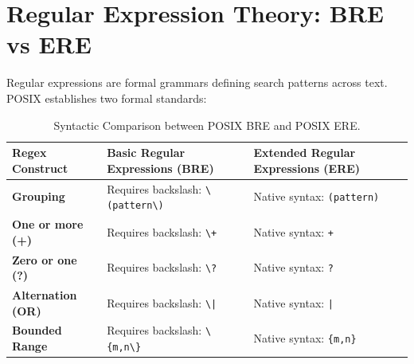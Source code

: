 \section{Regular Expression Theory: BRE vs ERE}
Regular expressions are formal grammars defining search patterns across text. POSIX establishes two formal standards:

\begin{table}[htbp]
\centering
\small
\begin{tabularx}{\linewidth}{l X X}
\toprule
\textbf{Regex Construct} & \textbf{Basic Regular Expressions (BRE)} & \textbf{Extended Regular Expressions (ERE)} \\
\midrule
\textbf{Grouping} & Requires backslash: \texttt{\textbackslash(pattern\textbackslash)} & Native syntax: \texttt{(pattern)} \\
\textbf{One or more (+)} & Requires backslash: \texttt{\textbackslash+} & Native syntax: \texttt{+} \\
\textbf{Zero or one (?)} & Requires backslash: \texttt{\textbackslash?} & Native syntax: \texttt{?} \\
\textbf{Alternation (OR)} & Requires backslash: \texttt{\textbackslash|} & Native syntax: \texttt{|} \\
\textbf{Bounded Range} & Requires backslash: \texttt{\textbackslash\{m,n\textbackslash\}} & Native syntax: \texttt{\{m,n\}} \\
\bottomrule
\end{tabularx}
\caption{Syntactic Comparison between POSIX BRE and POSIX ERE.}
\label{tab:bre-ere}
\end{table}

